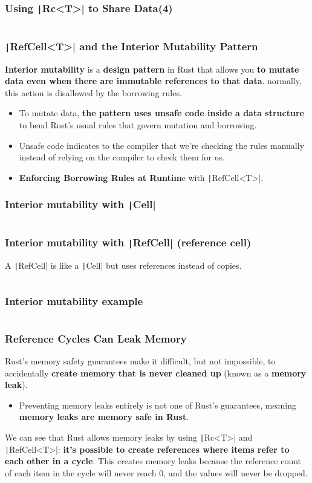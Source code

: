 \documentclass{beamer}
\begin{document}
\begin{frame}[fragile]
	\frametitle{Using \texttt|Rc<T>| to Share Data(4)}
	\inputminted{rust}{./code/smart9.rs}
	
\end{frame} 

\begin{frame}[fragile]
	\frametitle{\texttt|RefCell<T>| and the Interior Mutability Pattern}
	\textbf{Interior mutability} is a \textbf{design pattern} in Rust that allows you \textbf{to mutate data even when there are immutable references to that data}.
	normally, this action is disallowed by the borrowing rules. 
	\begin{itemize}
		\item To mutate data,\textbf{ the pattern uses unsafe code inside a data structure }to bend Rust’s usual rules that govern mutation and borrowing. 
		\item Unsafe code indicates to the compiler that we’re checking the rules manually instead of relying on the compiler to check them for us.
		\item \textbf{Enforcing Borrowing Rules at Runtim}e with \texttt|RefCell<T>|.
	\end{itemize}
\end{frame} 

\begin{frame}[fragile]
	\frametitle{Interior mutability with \texttt|Cell|}
	\inputminted[fontsize=\scriptsize]{rust}{./code/smart10.rs}
\end{frame} 

\begin{frame}[fragile]
	\frametitle{Interior mutability with  \texttt|RefCell| (reference cell) }
	A \texttt|RefCell| is like a \texttt|Cell| but uses references instead of copies.
	\inputminted[fontsize=\scriptsize]{rust}{./code/smart11.rs}
\end{frame} 

\begin{frame}[fragile]
	\frametitle{Interior mutability example}
	\inputminted[fontsize=\scriptsize]{rust}{./code/smart12.rs}
\end{frame} 

\begin{frame}[fragile]
	\frametitle{Reference Cycles Can Leak Memory}
	Rust’s memory safety guarantees make it difficult, but not impossible, to accidentally \textbf{create memory that is never cleaned up} (known as a \textbf{memory leak}). 
	\begin{itemize}
		\item Preventing memory leaks entirely is not one of Rust’s guarantees, meaning \textbf{memory leaks are memory safe in Rust}. 
	\end{itemize}

	We can see that Rust allows memory leaks by using \texttt|Rc<T>| and \texttt|RefCell<T>|:\textbf{ it’s possible to create references where items refer to each other in a cycle}. This creates memory leaks because the reference count of each item in the cycle will never reach 0, and the values will never be dropped.
\end{frame} 
\end{document}
